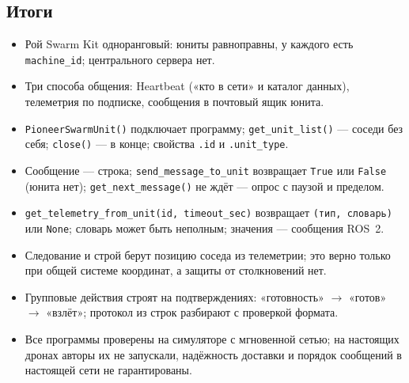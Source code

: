 \subsection*{Итоги}
\begin{itemize}
    \item Рой Swarm Kit одноранговый: юниты равноправны, у каждого есть \texttt{machine\_id}; центрального сервера нет.
    \item Три способа общения: Heartbeat («кто в сети» и каталог данных), телеметрия по подписке, сообщения в почтовый ящик юнита.
    \item \verb|PioneerSwarmUnit()| подключает программу; \verb|get_unit_list()| --- соседи без себя; \verb|close()| --- в конце; свойства \verb|.id| и \verb|.unit_type|.
    \item Сообщение --- строка; \verb|send_message_to_unit| возвращает \verb|True| или \verb|False| (юнита нет); \verb|get_next_message()| не ждёт --- опрос с паузой и пределом.
    \item \verb|get_telemetry_from_unit(id, timeout_sec)| возвращает \verb|(тип, словарь)| или \verb|None|; словарь может быть неполным; значения --- сообщения ROS~2.
    \item Следование и строй берут позицию соседа из телеметрии; это верно только при общей системе координат, а защиты от столкновений нет.
    \item Групповые действия строят на подтверждениях: «готовность» $\to$ «готов» $\to$ «взлёт»; протокол из строк разбирают с проверкой формата.
    \item Все программы проверены на симуляторе с мгновенной сетью; на настоящих дронах авторы их не запускали, надёжность доставки и порядок сообщений в настоящей сети не гарантированы.
\end{itemize}

